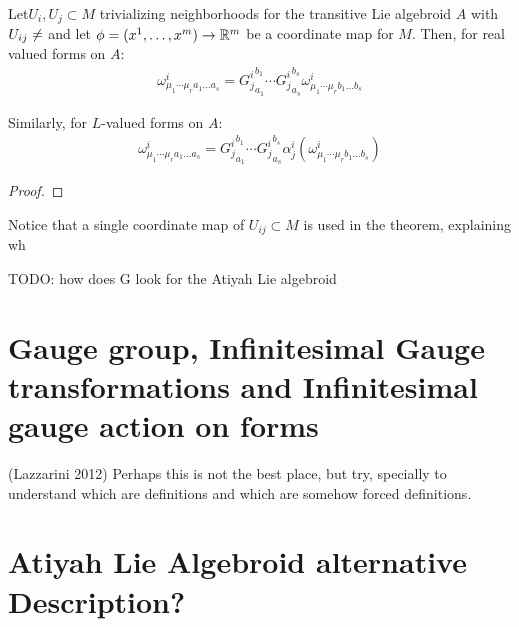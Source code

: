 \begin{theorem}
Let$U_i, U_j \subset M$ trivializing neighborhoods for the transitive Lie algebroid $A$ with $U_{ij} \neq \empty$ and let $\phi = (x^1, \dots, x^m) \to \RR^m$ be a coordinate map for $M$. Then, for real valued forms on $A$:
\begin{align}
    \omega^i_{\mu_1 \cdots \mu_r a_1 \dots a_s} = {G^i_j}^{b_1}_{a_1} \cdots {G^i_j}^{b_s}_{a_s} \omega^i_{\mu_1 \cdots \mu_r b_1 \dots b_s}
\end{align}

Similarly, for $L$-valued forms on $A$:
\begin{align}
    \omega^i_{\mu_1 \cdots \mu_r a_1 \dots a_s} = {G^i_j}^{b_1}_{a_1} \cdots {G^i_j}^{b_s}_{a_s} \alpha^i_j(\omega^i_{\mu_1 \cdots \mu_r b_1 \dots b_s})
\end{align}
\end{theorem}
\begin{proof}

\end{proof}
\begin{remark}
Notice that a single coordinate map of $U_{ij} \subset M$ is used in the theorem, explaining wh
\end{remark}

TODO: how does G look for the Atiyah Lie algebroid
\section{Gauge group, Infinitesimal Gauge transformations and Infinitesimal gauge action on forms}

(Lazzarini 2012) Perhaps this is not the best place, but try, specially to understand which are definitions and which are somehow forced definitions.

\section{Atiyah Lie Algebroid alternative Description?}


